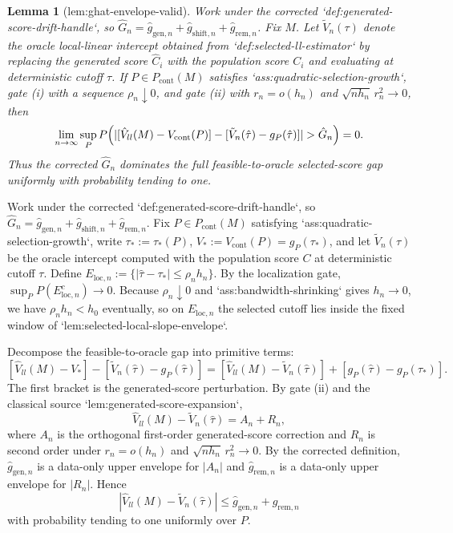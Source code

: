 \documentclass{article}
\newtheorem{lemma}{Lemma}
\begin{document}
\begin{lemma}[lem:ghat-envelope-valid]\label{lem:ghat-envelope-valid}
Work under the corrected `def:generated-score-drift-handle`, so \(\hat G_n=\hat g_{\mathrm{gen},n}+\hat g_{\mathrm{shift},n}+\hat g_{\mathrm{rem},n}\). Fix \(M\). Let \(\tilde V_n(\tau)\) denote the oracle local-linear intercept obtained from `def:selected-ll-estimator` by replacing the generated score \(\hat C_i\) with the population score \(C_i\) and evaluating at deterministic cutoff \(\tau\). If \(P\in P_{\mathrm{cont}}(M)\) satisfies `ass:quadratic-selection-growth`, gate (i) with a sequence \(\rho_n\downarrow 0\), and gate (ii) with \(r_n=o(h_n)\) and \(\sqrt{n h_n}\,r_n^2\to 0\), then
\[
\lim_{n\to\infty}\sup_P P\Bigl(|[\hat V_{ll}(M)-V_{\mathrm{cont}}(P)]-[\tilde V_n(\hat\tau)-g_P(\hat\tau)]|>\hat G_n\Bigr)=0.
\]
Thus the corrected \(\hat G_n\) dominates the full feasible-to-oracle selected-score gap uniformly with probability tending to one.
\end{lemma}
Work under the corrected `def:generated-score-drift-handle`, so \(\hat G_n=\hat g_{\mathrm{gen},n}+\hat g_{\mathrm{shift},n}+\hat g_{\mathrm{rem},n}\). Fix \(P\in P_{\mathrm{cont}}(M)\) satisfying `ass:quadratic-selection-growth`, write \(\tau_*:=\tau_*(P)\), \(V_*:=V_{\mathrm{cont}}(P)=g_P(\tau_*)\), and let \(\tilde V_n(\tau)\) be the oracle intercept computed with the population score \(C\) at deterministic cutoff \(\tau\). Define \(E_{\mathrm{loc},n}:=\{|\hat\tau-\tau_*|\le \rho_n h_n\}\). By the localization gate, \(\sup_P P(E_{\mathrm{loc},n}^c)\to 0\). Because \(\rho_n\downarrow 0\) and `ass:bandwidth-shrinking` gives \(h_n\to 0\), we have \(\rho_n h_n<h_0\) eventually, so on \(E_{\mathrm{loc},n}\) the selected cutoff lies inside the fixed window of `lem:selected-local-slope-envelope`.

Decompose the feasible-to-oracle gap into primitive terms:
\[
[\hat V_{ll}(M)-V_*]-[\tilde V_n(\hat\tau)-g_P(\hat\tau)]
=
[\hat V_{ll}(M)-\tilde V_n(\hat\tau)] + [g_P(\hat\tau)-g_P(\tau_*)].
\]
The first bracket is the generated-score perturbation. By gate (ii) and the classical source `lem:generated-score-expansion`,
\[
\hat V_{ll}(M)-\tilde V_n(\hat\tau)=A_n+R_n,
\]
where \(A_n\) is the orthogonal first-order generated-score correction and \(R_n\) is second order under \(r_n=o(h_n)\) and \(\sqrt{n h_n}\,r_n^2\to 0\). By the corrected definition, \(\hat g_{\mathrm{gen},n}\) is a data-only upper envelope for \(|A_n|\) and \(\hat g_{\mathrm{rem},n}\) is a data-only upper envelope for \(|R_n|\). Hence
\[
|\hat V_{ll}(M)-\tilde V_n(\hat\tau)|\le \hat g_{\mathrm{gen},n}+\hat g_{\mathrm{rem},n}
\]
with probability tending to one uniformly over \(P\).
\end{document}
